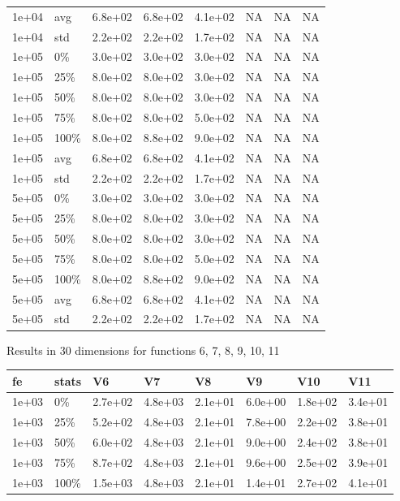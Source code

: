 \documentclass[11pt]{article}
\begin{document}
{\begin{longtable}{llllllll}
  1e+04 & avg & 6.8e+02 & 6.8e+02 & 4.1e+02 & NA & NA & NA \\ 
  1e+04 & std & 2.2e+02 & 2.2e+02 & 1.7e+02 & NA & NA & NA \\ 
  1e+05 & 0\% & 3.0e+02 & 3.0e+02 & 3.0e+02 & NA & NA & NA \\ 
  1e+05 & 25\% & 8.0e+02 & 8.0e+02 & 3.0e+02 & NA & NA & NA \\ 
  1e+05 & 50\% & 8.0e+02 & 8.0e+02 & 3.0e+02 & NA & NA & NA \\ 
  1e+05 & 75\% & 8.0e+02 & 8.0e+02 & 5.0e+02 & NA & NA & NA \\ 
  1e+05 & 100\% & 8.0e+02 & 8.8e+02 & 9.0e+02 & NA & NA & NA \\ 
  1e+05 & avg & 6.8e+02 & 6.8e+02 & 4.1e+02 & NA & NA & NA \\ 
  1e+05 & std & 2.2e+02 & 2.2e+02 & 1.7e+02 & NA & NA & NA \\ 
  5e+05 & 0\% & 3.0e+02 & 3.0e+02 & 3.0e+02 & NA & NA & NA \\ 
  5e+05 & 25\% & 8.0e+02 & 8.0e+02 & 3.0e+02 & NA & NA & NA \\ 
  5e+05 & 50\% & 8.0e+02 & 8.0e+02 & 3.0e+02 & NA & NA & NA \\ 
  5e+05 & 75\% & 8.0e+02 & 8.0e+02 & 5.0e+02 & NA & NA & NA \\ 
  5e+05 & 100\% & 8.0e+02 & 8.8e+02 & 9.0e+02 & NA & NA & NA \\ 
  5e+05 & avg & 6.8e+02 & 6.8e+02 & 4.1e+02 & NA & NA & NA \\ 
  5e+05 & std & 2.2e+02 & 2.2e+02 & 1.7e+02 & NA & NA & NA \\ 
   \hline
\hline
\end{longtable}
\newpage
Results in 30 dimensions for functions 6, 7, 8, 9, 10, 11
\begin{longtable}{llllllll}
  \hline
fe & stats & V6 & V7 & V8 & V9 & V10 & V11 \\ 
  \hline
1e+03 & 0\% & 2.7e+02 & 4.8e+03 & 2.1e+01 & 6.0e+00 & 1.8e+02 & 3.4e+01 \\ 
  1e+03 & 25\% & 5.2e+02 & 4.8e+03 & 2.1e+01 & 7.8e+00 & 2.2e+02 & 3.8e+01 \\ 
  1e+03 & 50\% & 6.0e+02 & 4.8e+03 & 2.1e+01 & 9.0e+00 & 2.4e+02 & 3.8e+01 \\ 
  1e+03 & 75\% & 8.7e+02 & 4.8e+03 & 2.1e+01 & 9.6e+00 & 2.5e+02 & 3.9e+01 \\ 
  1e+03 & 100\% & 1.5e+03 & 4.8e+03 & 2.1e+01 & 1.4e+01 & 2.7e+02 & 4.1e+01 \\ 

\end{longtable}}
\end{document}
